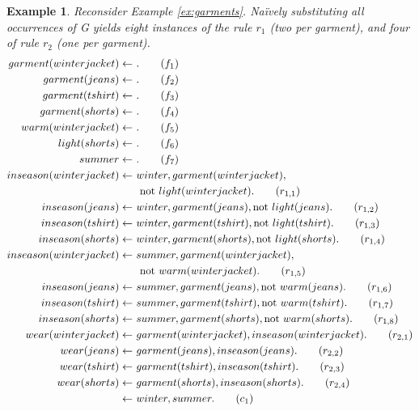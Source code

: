 \documentclass{vutinfth} %
\newtheorem{example}{Example}[chapter]
\newcommand{\fail}{\mathrm{not } \ \xspace}
\newcommand{\from}{\ensuremath{\leftarrow}}
\begin{document}
\begin{example}
\label{ex:garmentsground}
Reconsider Example \ref{ex:garments}. Na{\"i}vely substituting all occurrences of \emph{G} yields eight instances of the rule $r_1$ (two per garment), and four of rule $r_2$ (one per garment).
\begin{align}
garment(winterjacket)\from& \ . \tag{$f_1$}\label{ex:garmentsground:garments:begin}\\
garment(jeans)\from& \ .\tag{$f_2$}\\
garment(tshirt)\from& \ .\tag{$f_3$}\\
garment(shorts)\from& \ .\tag{$f_4$}\label{ex:garmentsground:garments:end}\\
warm(winterjacket)\from& \ .\tag{$f_5$}\label{ex:garmentsground:style:begin}\\
light(shorts)\from& \ .\tag{$f_6$}\label{ex:garmentsground:style:end}\\
summer\from& \ .\tag{$f_7$}\label{ex:garmentsground:season}\\
inseason(winterjacket) \from& \ winter, garment(winterjacket), \notag\\
& \ \ \fail light(winterjacket). \tag{$r_{1,1}$}\label{ex:garmentsground:inseason:begin}\\
inseason(jeans) \from& \ winter, garment(jeans), \fail light(jeans).\tag{$r_{1,2}$}\\
inseason(tshirt) \from& \ winter, garment(tshirt), \fail light(tshirt).\tag{$r_{1,3}$}\\
inseason(shorts) \from& \ winter, garment(shorts), \fail light(shorts).\tag{$r_{1,4}$}\\
inseason(winterjacket) \from& \ summer, garment(winterjacket), \notag\\
& \ \ \fail warm(winterjacket).\tag{$r_{1,5}$}\\
inseason(jeans) \from& \ summer, garment(jeans), \fail warm(jeans).\tag{$r_{1,6}$}\\
inseason(tshirt) \from& \ summer, garment(tshirt), \fail warm(tshirt).\tag{$r_{1,7}$}\\
inseason(shorts) \from& \ summer, garment(shorts), \fail warm(shorts). \tag{$r_{1,8}$}\label{ex:garmentsground:inseason:end}\\
wear(winterjacket) \from& \ garment(winterjacket), inseason(winterjacket).\tag{$r_{2,1}$}\\
wear(jeans) \from& \ garment(jeans), inseason(jeans).\tag{$r_{2,2}$}\\
wear(tshirt) \from& \ garment(tshirt), inseason(tshirt).\tag{$r_{2,3}$}\\
wear(shorts) \from& \ garment(shorts), inseason(shorts).\tag{$r_{2,4}$}\\
\from& \ winter, summer.\tag{$c_1$} \label{ex:garmentsground:seasons}
\end{align}
\end{example}
\end{document}
